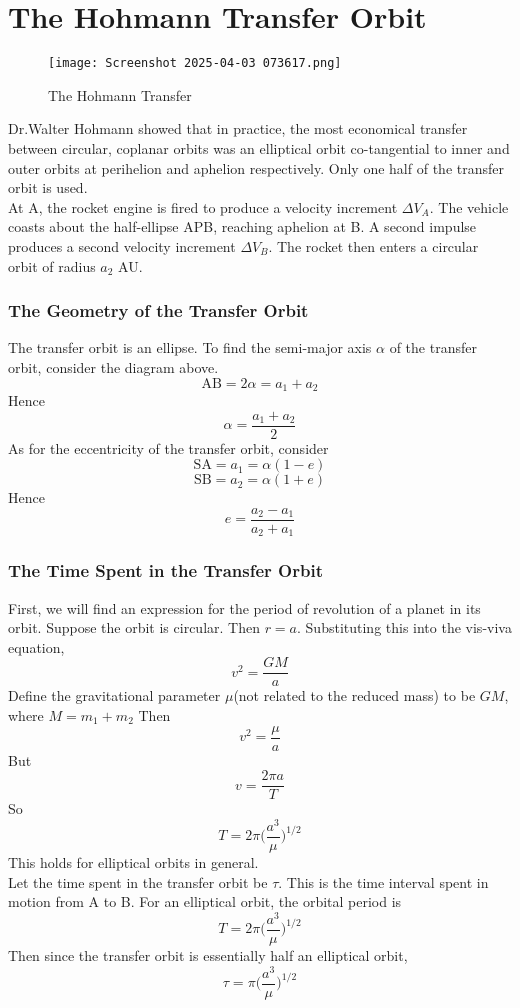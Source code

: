\documentclass{article}
\begin{document}
\section{The Hohmann Transfer Orbit}
\begin{figure}
    \centering
    \texttt{[image: Screenshot 2025-04-03 073617.png]}
    \caption{The Hohmann Transfer}
    \label{fig:3}
\end{figure}
Dr.Walter Hohmann showed that in practice, the most economical transfer between circular, coplanar orbits was an elliptical orbit co-tangential to inner and outer orbits at perihelion and aphelion respectively. Only one half of the transfer orbit is used.
\\
At A, the rocket engine is fired to produce a velocity increment $\Delta V_A$. The vehicle coasts about the half-ellipse APB, reaching aphelion at B. A second impulse produces a second velocity increment $\Delta V_B$. The rocket then enters a circular orbit of radius $a_2$ AU.
\subsubsection{The Geometry of the Transfer Orbit}
The transfer orbit is an ellipse. To find the semi-major axis $\alpha$ of the transfer orbit, consider the diagram above.
$$\text{AB}=2\alpha=a_1+a_2$$
Hence
$$\alpha=\frac{a_1+a_2}{2}$$
As for the eccentricity of the transfer orbit, consider
$$\text{SA}=a_1=\alpha(1-e)$$
$$\text{SB}=a_2=\alpha(1+e)$$
Hence
$$e=\frac{a_2-a_1}{a_2+a_1}$$
\subsubsection{The Time Spent in the Transfer Orbit}
First, we will find an expression for the period of revolution of a planet in its orbit. Suppose the orbit is circular. Then $r=a$. Substituting this into the vis-viva equation,
$$v^2=\frac{GM}{a}$$
Define the gravitational parameter $\mu$(not related to the reduced mass) to be $GM$, where $M=m_1+m_2$ Then
$$v^2=\frac{\mu}{a}$$
But 
$$v=\frac{2\pi a}{T}$$
So
$$T=2\pi\Bigg(\frac{a^3}{\mu}\Bigg)^{1/2}$$
This holds for elliptical orbits in general.
\\
Let the time spent in the transfer orbit be $\tau$. This is the time interval spent in motion from A to B. For an elliptical orbit, the orbital period is 
$$T=2\pi \Bigg(\frac{a^3}{\mu}\Bigg)^{1/2}$$
Then since the transfer orbit is essentially half an elliptical orbit,
$$\tau=\pi\Bigg(\frac{a^3}{\mu}\Bigg)^{1/2}$$
\end{document}
